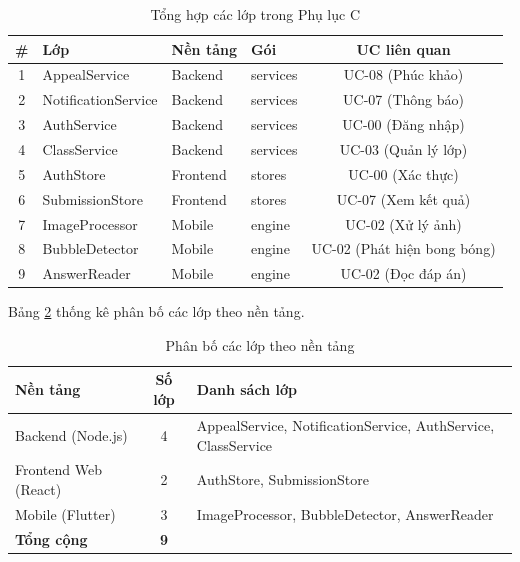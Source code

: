 \documentclass[../DoAn.tex]{subfiles}
\begin{document}
\begin{table}[H]
\centering
\begin{tabular}{|c|p{3.5cm}|p{2.5cm}|p{2.5cm}|c|}
\hline
\textbf{\#} & \textbf{Lớp} & \textbf{Nền tảng} & \textbf{Gói} & \textbf{UC liên quan} \\ \hline
1 & AppealService & Backend & services & UC-08 (Phúc khảo) \\ \hline
2 & NotificationService & Backend & services & UC-07 (Thông báo) \\ \hline
3 & AuthService & Backend & services & UC-00 (Đăng nhập) \\ \hline
4 & ClassService & Backend & services & UC-03 (Quản lý lớp) \\ \hline
5 & AuthStore & Frontend & stores & UC-00 (Xác thực) \\ \hline
6 & SubmissionStore & Frontend & stores & UC-07 (Xem kết quả) \\ \hline
7 & ImageProcessor & Mobile & engine & UC-02 (Xử lý ảnh) \\ \hline
8 & BubbleDetector & Mobile & engine & UC-02 (Phát hiện bong bóng) \\ \hline
9 & AnswerReader & Mobile & engine & UC-02 (Đọc đáp án) \\ \hline
\end{tabular}
\caption{Tổng hợp các lớp trong Phụ lục C}
\label{table:appendix_classes_summary}
\end{table}

Bảng \ref{table:appendix_classes_platform} thống kê phân bố các lớp theo nền tảng.

\begin{table}[H]
\centering
\begin{tabular}{|p{4.5cm}|c|p{6cm}|}
\hline
\textbf{Nền tảng} & \textbf{Số lớp} & \textbf{Danh sách lớp} \\ \hline
Backend (Node.js) & 4 & AppealService, NotificationService, AuthService, ClassService \\ \hline
Frontend Web (React) & 2 & AuthStore, SubmissionStore \\ \hline
Mobile (Flutter) & 3 & ImageProcessor, BubbleDetector, AnswerReader \\ \hline
\textbf{Tổng cộng} & \textbf{9} & \\ \hline
\end{tabular}
\caption{Phân bố các lớp theo nền tảng}
\label{table:appendix_classes_platform}
\end{table}
\end{document}
